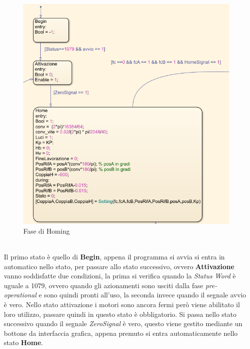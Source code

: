 \begin{figure}[ht]
\begin{center}
    \includegraphics[scale=0.8]{Immagini/Sperimentale/state1new.png}
    \caption{Fase di Homing}
    \label{fig:Zero}
\end{center}
\end{figure}
\\Il primo stato è quello di \textbf{Begin}, appena il programma si avvia si entra in automatico nello stato, per passare allo stato successivo, ovvero \textbf{Attivazione} vanno soddisfatte due condizioni, la prima si verifica quando la \textit{Status Word} è uguale a 1079, ovvero quando gli azionamenti sono usciti dalla fase \textit{pre-operational} e sono quindi pronti all'uso, la seconda invece quando il segnale avvio è vero. Nello stato attivazione i motori sono ancora fermi però viene abilitato il loro utilizzo, passare quindi in questo stato è obbligatorio. Si passa nello stato successivo quando il segnale \textit{ZeroSignal} è vero, questo viene gestito mediante un bottone da interfaccia grafica, appena premuto si entra automaticamente nello stato \textbf{Home}. 
